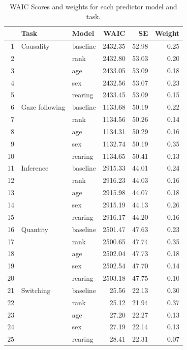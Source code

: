 \documentclass[10pt, letterpaper]{article}
\begin{document}
\begin{table}[H]
\centering
\begin{tabular}{rllrrr}
  \hline
 & Task & Model & WAIC & SE & Weight \\ 
  \hline
1 & Causality & baseline & 2432.35 & 52.98 & 0.25 \\ 
  2 &  & rank & 2432.80 & 53.03 & 0.20 \\ 
  3 &  & age & 2433.05 & 53.09 & 0.18 \\ 
  4 &  & sex & 2432.56 & 53.07 & 0.23 \\ 
  5 &  & rearing & 2433.45 & 53.09 & 0.15 \\ 
  6 & Gaze following & baseline & 1133.68 & 50.19 & 0.22 \\ 
  7 &  & rank & 1134.56 & 50.26 & 0.14 \\ 
  8 &  & age & 1134.31 & 50.29 & 0.16 \\ 
  9 &  & sex & 1132.74 & 50.19 & 0.35 \\ 
  10 &  & rearing & 1134.65 & 50.41 & 0.13 \\ 
  11 & Inference & baseline & 2915.33 & 44.01 & 0.24 \\ 
  12 &  & rank & 2916.23 & 44.03 & 0.16 \\ 
  13 &  & age & 2915.98 & 44.07 & 0.18 \\ 
  14 &  & sex & 2915.19 & 44.13 & 0.26 \\ 
  15 &  & rearing & 2916.17 & 44.20 & 0.16 \\ 
  16 & Quantity & baseline & 2501.47 & 47.63 & 0.23 \\ 
  17 &  & rank & 2500.65 & 47.74 & 0.35 \\ 
  18 &  & age & 2502.04 & 47.73 & 0.18 \\ 
  19 &  & sex & 2502.54 & 47.70 & 0.14 \\ 
  20 &  & rearing & 2503.18 & 47.75 & 0.10 \\ 
  21 & Switching & baseline & 25.56 & 22.13 & 0.30 \\ 
  22 &  & rank & 25.12 & 21.94 & 0.37 \\ 
  23 &  & age & 27.20 & 22.27 & 0.13 \\ 
  24 &  & sex & 27.19 & 22.14 & 0.13 \\ 
  25 &  & rearing & 28.41 & 22.31 & 0.07 \\ 
   \hline
\end{tabular}
\caption{WAIC Scores and weights for each predictor model and task.} 
\end{table}
\end{document}
